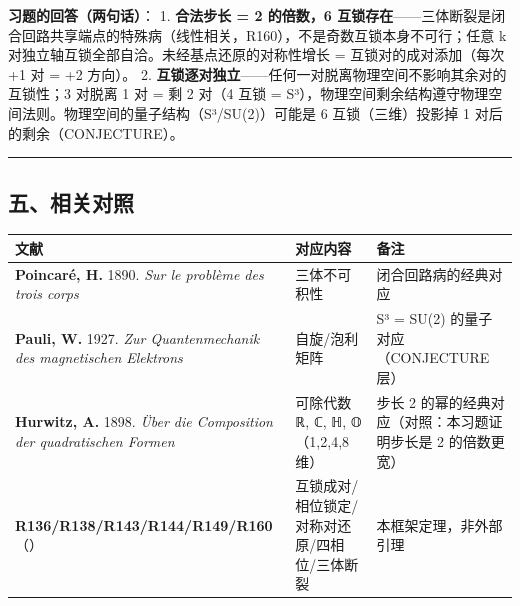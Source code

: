 \documentclass[
]{article}
\newcounter{none} %
\begin{document}
\textbf{习题的回答（两句话）}： 1. \textbf{合法步长 = 2 的倍数，6
互锁存在}------三体断裂是闭合回路共享端点的特殊病（线性相关，R160），不是奇数互锁本身不可行；任意
k 对独立轴互锁全部自洽。未经基点还原的对称性增长 =
互锁对的成对添加（每次 +1 对 = +2 方向）。 2.
\textbf{互锁逐对独立}------任何一对脱离物理空间不影响其余对的互锁性；3
对脱离 1 对 = 剩 2 对（4 互锁 =
S³），物理空间剩余结构遵守物理空间法则。物理空间的量子结构（S³/SU(2)）可能是
6 互锁（三维）投影掉 1 对后的剩余（CONJECTURE）。

\begin{center}\rule{0.5\linewidth}{0.5pt}\end{center}

\subsection{五、相关对照}\label{ux4e94ux76f8ux5173ux5bf9ux7167}

{\def\LTcaptype{none} %
\begin{longtable}[]{@{}
 >{\raggedright\arraybackslash}p{}
 >{\raggedright\arraybackslash}p{}
 >{\raggedright\arraybackslash}p{}@{}}
\toprule\noalign{}
\begin{minipage}[b]{\linewidth}\raggedright
文献
\end{minipage} & \begin{minipage}[b]{\linewidth}\raggedright
对应内容
\end{minipage} & \begin{minipage}[b]{\linewidth}\raggedright
备注
\end{minipage} \\
\midrule\noalign{}
\endhead
\bottomrule\noalign{}
\endlastfoot
\textbf{Poincaré, H.} 1890. \emph{Sur le problème des trois corps} &
三体不可积性 & 闭合回路病的经典对应 \\
\textbf{Pauli, W.} 1927. \emph{Zur Quantenmechanik des magnetischen
Elektrons} & 自旋/泡利矩阵 & S³ = SU(2) 的量子对应（CONJECTURE 层） \\
\textbf{Hurwitz, A.} 1898. \emph{Über die Composition der quadratischen
Formen} & 可除代数 ℝ, ℂ, ℍ, 𝕆（1,2,4,8 维） & 步长 2
的幂的经典对应（对照：本习题证明步长是 2 的倍数更宽） \\
\textbf{R136/R138/R143/R144/R149/R160}（） &
互锁成对/相位锁定/对称对还原/四相位/三体断裂 & 本框架定理，非外部引理 \\
\end{longtable}
}
\end{document}
